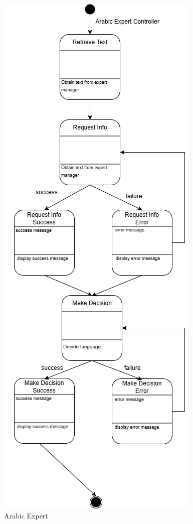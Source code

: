 \begin{figure}[H]
	\centering
	\includegraphics[width=\textwidth, height=\textheight, keepaspectratio]{Section2/images/arabic_expert_state_diagram.png}
	\caption{Arabic Expert}
	\label{ArabicExpert}
\end{figure}